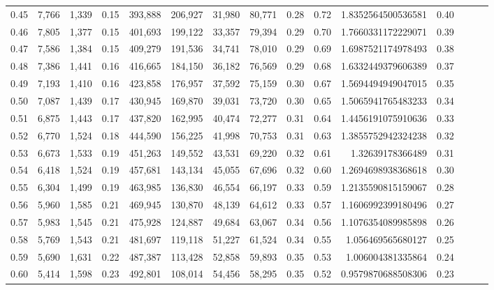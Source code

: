 \begin{tabular}{rrrrrrrrrrrrrrr}
0.45 &   7,766 &  1,339 &  0.15 &  393,888 &  206,927 &   31,980 &   80,771 &  0.28 &  0.72 &    1.8352564500536581 &      0.40 \\
0.46 &   7,805 &  1,377 &  0.15 &  401,693 &  199,122 &   33,357 &   79,394 &  0.29 &  0.70 &    1.7660331172229071 &      0.39 \\
0.47 &   7,586 &  1,384 &  0.15 &  409,279 &  191,536 &   34,741 &   78,010 &  0.29 &  0.69 &    1.6987521174978493 &      0.38 \\
0.48 &   7,386 &  1,441 &  0.16 &  416,665 &  184,150 &   36,182 &   76,569 &  0.29 &  0.68 &    1.6332449379606389 &      0.37 \\
0.49 &   7,193 &  1,410 &  0.16 &  423,858 &  176,957 &   37,592 &   75,159 &  0.30 &  0.67 &    1.5694494949047015 &      0.35 \\
0.50 &   7,087 &  1,439 &  0.17 &  430,945 &  169,870 &   39,031 &   73,720 &  0.30 &  0.65 &    1.5065941765483233 &      0.34 \\
0.51 &   6,875 &  1,443 &  0.17 &  437,820 &  162,995 &   40,474 &   72,277 &  0.31 &  0.64 &    1.4456191075910636 &      0.33 \\
0.52 &   6,770 &  1,524 &  0.18 &  444,590 &  156,225 &   41,998 &   70,753 &  0.31 &  0.63 &    1.3855752942324238 &      0.32 \\
0.53 &   6,673 &  1,533 &  0.19 &  451,263 &  149,552 &   43,531 &   69,220 &  0.32 &  0.61 &      1.32639178366489 &      0.31 \\
0.54 &   6,418 &  1,524 &  0.19 &  457,681 &  143,134 &   45,055 &   67,696 &  0.32 &  0.60 &    1.2694698938368618 &      0.30 \\
0.55 &   6,304 &  1,499 &  0.19 &  463,985 &  136,830 &   46,554 &   66,197 &  0.33 &  0.59 &    1.2135590815159067 &      0.28 \\
0.56 &   5,960 &  1,585 &  0.21 &  469,945 &  130,870 &   48,139 &   64,612 &  0.33 &  0.57 &    1.1606992399180496 &      0.27 \\
0.57 &   5,983 &  1,545 &  0.21 &  475,928 &  124,887 &   49,684 &   63,067 &  0.34 &  0.56 &    1.1076354089985898 &      0.26 \\
0.58 &   5,769 &  1,543 &  0.21 &  481,697 &  119,118 &   51,227 &   61,524 &  0.34 &  0.55 &     1.056469565680127 &      0.25 \\
0.59 &   5,690 &  1,631 &  0.22 &  487,387 &  113,428 &   52,858 &   59,893 &  0.35 &  0.53 &     1.006004381335864 &      0.24 \\
0.60 &   5,414 &  1,598 &  0.23 &  492,801 &  108,014 &   54,456 &   58,295 &  0.35 &  0.52 &    0.9579870688508306 &      0.23 \\

\end{tabular}
